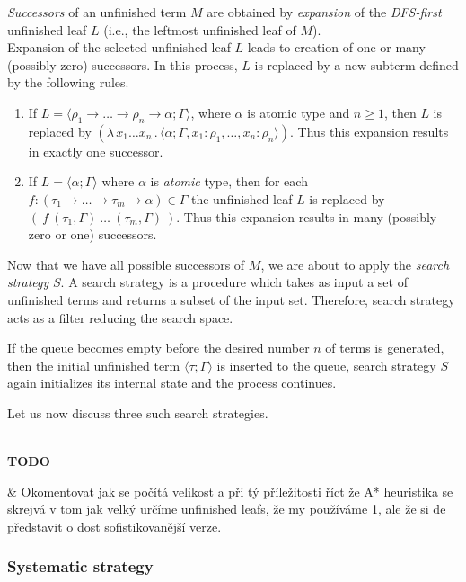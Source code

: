 \documentclass{llncs}
\newcommand{\Lets}{Let us\xspace}
\newcommand{\lamb}[2]{( \lambda \, #1 \, . \, #2 )}
\newcommand{\ar}{\rightarrow\xspace}
\newenvironment{todo}
{~\\ {\color{red}\textbf{TODO}}
  \begin{easylist}[itemize]}
{ \end{easylist}}
\newcommand{\ul}[2]{\langle #1 ; #2 \rangle}
\begin{document}
\textit{Successors} of an unfinished term $M$ are obtained by 
\textit{expansion} of the \mbox{\textit{DFS-first}} unfinished leaf $L$
(i.e., the leftmost unfinished leaf of $M$).\\

Expansion of the selected unfinished leaf $L$ leads to creation of 
one or many (possibly zero) successors.
In this process, $L$ is replaced
by a new subterm defined by the following rules.
\begin{enumerate}
 \item If $L = \ul{\rho_1 \ar \dots \ar \rho_n \ar \alpha}{\Gamma}$,
 	   where $\alpha$ is atomic type and $n \geq 1$, 
       then $L$ is replaced by 
       $\lamb{x_1 \dots x_n}{\ul{\alpha}
       {\Gamma,x_1 \colon \rho_1,\dots,x_n \colon \rho_n}}$.
       Thus this expansion results in exactly one successor.  
 \item If $L = \ul{\alpha}{\Gamma}$ where $\alpha$ is \textit{atomic} type,
       then for each 
       \mbox{$f : (\tau_1 \ar \dots \ar \tau_m \ar \alpha) \in \Gamma$}
       the unfinished leaf $L$ is replaced by 
       $(~f~(\tau_1,\Gamma)~\dots~(\tau_m,\Gamma)~)$.
       Thus this expansion results in many (possibly zero or one) successors.
\end{enumerate}

Now that we have all possible successors of $M$, we are about to apply
the \textit{search strategy} $S$. A search strategy is a procedure
which takes as input a set of unfinished terms and returns a subset
of the input set. Therefore, search strategy acts as a filter reducing 
the search space. 

If the queue becomes empty before the desired number $n$ of terms
is generated, then the initial unfinished term $\ul{\tau}{\Gamma}$ 
is inserted to the queue, search strategy $S$
again initializes its internal state and the process continues.

\Lets now discuss three such search strategies.

\begin{todo}
 & Okomentovat jak se počítá velikost a při tý příležitosti říct
   že A* heuristika se skrejvá v tom jak velký určíme unfinished leafs,
   že my používáme 1, ale že si de představit o dost sofistikovanější 
   verze.   
\end{todo}

\subsubsection{Systematic strategy}
\end{document}
